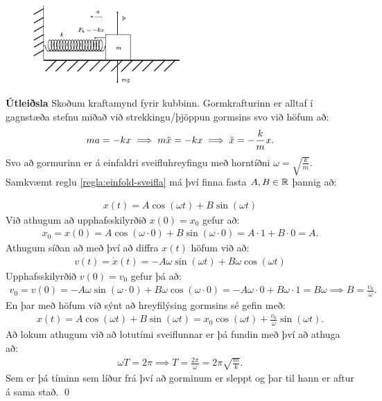 \begin{minipage}{\linewidth}

\begin{figure}
\includegraphics[width=2.2in]{figures/forces-spring.pdf}
\end{figure}

\textbf{Útleiðsla} Skoðum kraftamynd fyrir kubbinn. Gormkrafturinn er alltaf í gagnstæða stefnu miðað við strekkingu/þjöppun gormsins svo við höfum að:
\begin{align*}
    ma = -kx \implies m\Ddot{x} = -kx \implies \Ddot{x} = - \frac{k}{m}x.
\end{align*}
Svo að gormurinn er á einfaldri sveifluhreyfingu með horntíðni $\omega = \sqrt{\frac{k}{m}}$. Samkvæmt reglu \ref{regla:einfold-sveifla} má því finna fasta $A, B \in \mathbb{R}$ þannig að:
\end{minipage}
\begin{align*}
    x(t) = A\cos(\omega t) + B\sin(\omega t)
\end{align*}
Við athugum að upphafsskilyrðið $x(0) = x_0$ gefur að:
\begin{align*}
    x_0 = x(0) = A \cos(\omega \cdot 0) + B \sin(\omega \cdot 0) = A \cdot 1  + B \cdot 0 = A.
\end{align*}
Athugum síðan að með því að diffra $x(t)$ höfum við að:
\begin{align*}
   v(t) = \dot{x}(t) = -A\omega \sin(\omega t) + B\omega \cos(\omega t)
\end{align*}
Upphafsskilyrðið $v(0) = v_0$ gefur þá að:
\begin{align*}
    v_0 = v(0) = -A\omega \sin(\omega \cdot 0) + B\omega \cos(\omega \cdot 0) = -A \omega \cdot 0 + B \omega \cdot 1 = B\omega \implies B = \frac{v_0}{\omega}.
\end{align*}
En þar með höfum við sýnt að hreyfilýsing gormsins sé gefin með:
\begin{align*}
    x(t) = A\cos(\omega t) + B\sin(\omega t) = x_0 \cos(\omega t) + \frac{v_0}{\omega} \sin(\omega t).
\end{align*}
Að lokum athugum við að lotutími sveiflunnar er þá fundin með því að athuga að:
\begin{align*}
    \omega T = 2\pi \implies T = \frac{2\pi}{\omega} = 2\pi \sqrt{\frac{m}{k}}.
\end{align*}
Sem er þá tíminn sem líður frá því að gorminum er sleppt og þar til hann er aftur á sama stað.
\qed


